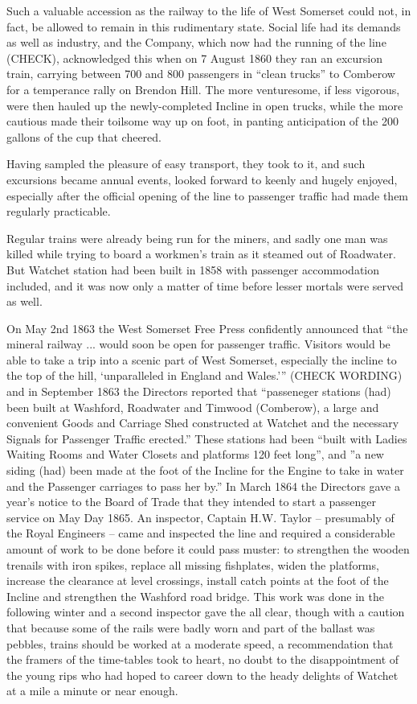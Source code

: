 \documentclass[11pt]{book}
\begin{document}
Such a valuable accession as the railway to the life of West Somerset could not, in fact, be allowed to remain in this rudimentary state. Social life had its demands as well as industry, and the Company, which now had the running of the line (CHECK), acknowledged this when on 7 August 1860 they ran an excursion train, carrying between 700 and 800 passengers in “clean trucks”  to Comberow for a temperance rally on Brendon Hill. The more venturesome, if less vigorous, were then hauled up the newly-completed Incline in open trucks, while the more cautious made their toilsome way up on foot, in panting anticipation of the 200 gallons of the cup that cheered.

Having sampled the pleasure of easy transport, they took to it, and such excursions became annual events, looked forward to keenly and hugely enjoyed, especially after the official opening of the line to passenger traffic had made them regularly practicable.

Regular trains were already being run for the miners, and sadly one man was killed while trying to board a workmen’s train as it steamed out of Roadwater. But Watchet station had been built in 1858 with passenger accommodation included, and it was now only a matter of time before lesser mortals were served as well.  

On May 2nd 1863 the West Somerset Free Press confidently announced that “the mineral railway ... would soon be open for passenger traffic. Visitors would be able to take a trip into a scenic part of West Somerset, especially the incline to the top of the hill, ‘unparalleled in England and Wales.’” (CHECK WORDING) and in September 1863 the Directors reported that “passeneger stations (had) been built at Washford, Roadwater and Timwood (Comberow), a large and convenient Goods and Carriage Shed constructed at Watchet and the necessary Signals for Passenger Traffic erected.”  These stations had been “built with Ladies Waiting Rooms and Water Closets and platforms 120 feet long”, and ”a new siding (had) been made at the foot of the Incline for the Engine to take in water and the Passenger carriages to pass her by.”  In March 1864 the Directors gave a year’s notice to the Board of Trade that they intended to start a passenger service on May Day 1865.  An inspector, Captain H.W. Taylor – presumably of the Royal Engineers – came and inspected the line and required a considerable amount of work to be done before it could pass muster:  to strengthen the wooden trenails with iron spikes, replace all missing fishplates, widen the platforms, increase the clearance at level crossings, install catch points at the foot of the Incline and strengthen the Washford road bridge.  This work was done in the following winter and a second inspector gave the all clear, though with a caution that because some of the rails were badly worn and part of the ballast was pebbles, trains should be worked at a moderate speed, a recommendation that the framers of the time-tables took to heart, no doubt to the disappointment of the young rips who had hoped to career down to the heady delights of Watchet at a mile a minute or near enough.
\end{document}
